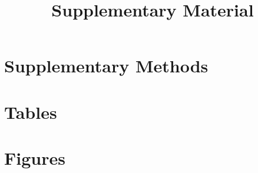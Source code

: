 \UseRawInputEncoding









\begin{frontmatter}
    \title{Supplementary Material}
	
\end{frontmatter}



\section{Supplementary Methods}




\clearpage
\section*{Tables}
\label{tables}


\clearpage
\section*{Figures}
\label{figures}







